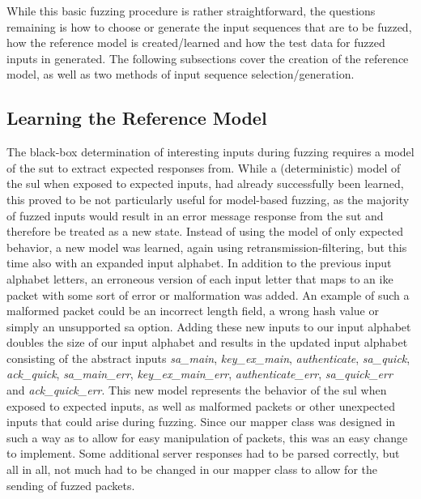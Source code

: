 While this basic fuzzing procedure is rather straightforward, the questions remaining is how to choose or generate the input sequences that are to be fuzzed, how the reference model is created/learned and how the test data for fuzzed inputs in generated. The following subsections cover the creation of the reference model, as well as two methods of input sequence selection/generation.

\subsection{Learning the Reference Model} \label{subsec:adapting_model}
The black-box determination of interesting inputs during fuzzing requires a model of the \ac{sut} to extract expected responses from. While a (deterministic) model of the \ac{sul} when exposed to expected inputs, had already successfully been learned, this proved to be not particularly useful for model-based fuzzing, as the majority of fuzzed inputs would result in an error message response from the \ac{sut} and therefore be treated as a new state. Instead of using the model of only expected behavior, a new model was learned, again using retransmission-filtering, but this time also with an expanded input alphabet. In addition to the previous input alphabet letters, an erroneous version of each input letter that maps to an \ac{ike} packet with some sort of error or malformation was added. An example of such a malformed packet could be an incorrect length field, a wrong hash value or simply an unsupported \ac{sa} option. Adding these new inputs to our input alphabet doubles the size of our input alphabet and results in the updated input alphabet consisting of the abstract inputs \emph{sa\_main}, \emph{key\_ex\_main}, \emph{authenticate}, \emph{sa\_quick}, \emph{ack\_quick}, \emph{sa\_main\_err}, \emph{key\_ex\_main\_err}, \emph{authenticate\_err}, \emph{sa\_quick\_err} and \emph{ack\_quick\_err}. This new model represents the behavior of the \ac{sul} when exposed to expected inputs, as well as malformed packets or other unexpected inputs that could arise during fuzzing. Since our mapper class was designed in such a way as to allow for easy manipulation of packets, this was an easy change to implement. Some additional server responses had to be parsed correctly, but all in all, not much had to be changed in our mapper class to allow for the sending of fuzzed packets. 


